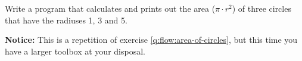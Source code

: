 Write a program that calculates and prints out the area ($\pi \cdot r^2$) of three circles that have the radiuses 1, 3 and 5.

\textbf{Notice:} This is a repetition of exercise \ref{q:flow:area-of-circles}, but this time you have a larger toolbox at your disposal.
